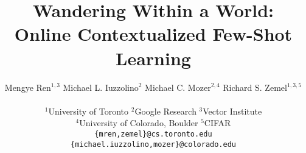 \documentclass{article}
\title{
Wandering Within a World: \\Online Contextualized Few-Shot Learning
}
\author{
  Mengye Ren${}^{1,3}$ \quad Michael L. Iuzzolino${}^{2}$ \quad Michael C. Mozer${}^{2,4}$ \quad Richard S. Zemel${}^{1,3,5}$\\\\
  ${}^1$University of Toronto \quad
  ${}^2$Google Research \quad
  ${}^3$Vector Institute \quad \\
  ${}^4$University of Colorado, Boulder \quad
  ${}^5$CIFAR \\
  \texttt{\{mren,zemel\}@cs.toronto.edu}\\ \texttt{\{michael.iuzzolino,mozer\}@colorado.edu}
}
\begin{document}
\maketitle










{


}

\appendix

\end{document}

